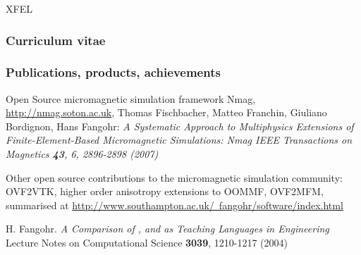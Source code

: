 \begin{sitedescription}{XFEL}
\subsubsection*{Curriculum vitae}

%
% 
% 
% 
%
\subsubsection*{Publications, products, achievements}

\begin{compactenum}
\item Open Source micromagnetic simulation framework Nmag,
  \href{http://nmag.soton.ac.uk}{http://nmag.soton.ac.uk}, Thomas
  Fischbacher, Matteo Franchin, Giuliano Bordignon, Hans Fangohr: \emph{
A Systematic Approach to Multiphysics Extensions of Finite-Element-Based Micromagnetic Simulations: Nmag
IEEE Transactions on Magnetics \textbf{43}, 6, 2896-2898 (2007)}
\item Other open source contributions to the micromagnetic simulation
  community: OVF2VTK, higher order anisotropy extensions to OOMMF,
  OVF2MFM, summarised at
  \href{http://www.southampton.ac.uk/~fangohr/software/index.html}{http://www.southampton.ac.uk/~fangohr/software/index.html}
\item H. Fangohr.
\emph{A Comparison of , \Matlab and \Python as Teaching Languages in Engineering}
Lecture Notes on Computational Science \textbf{3039}, 1210-1217 (2004)
\end{compactenum}

\end{sitedescription}







